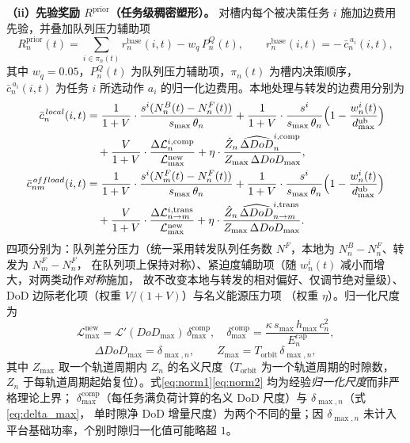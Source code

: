 \documentclass[a4paper,11pt]{article}
\begin{document}
\noindent\textbf{（ii）先验奖励 $R^{\mathrm{prior}}$（任务级稠密塑形）。}
对槽内每个被决策任务 $i$ 施加边费用先验，并叠加队列压力辅助项
\begin{equation}
R^{\mathrm{prior}}_n(t) = \sum_{i \in \pi_n(t)} r^{\mathrm{base}}_n(i,t) - w_q\, P^{Q}_n(t),
\qquad
r^{\mathrm{base}}_n(i,t) = -\,\bar{c}^{\,a_i}_n(i,t),
\label{eq:reward_prior}
\end{equation}
其中 $w_q=0.05$，$P^{Q}_n(t)$ 为队列压力辅助项，$\pi_n(t)$ 为槽内决策顺序，
$\bar{c}^{\,a_i}_n(i,t)$ 为任务 $i$ 所选动作 $a_i$ 的归一化边费用。本地处理与转发的边费用分别为
\begin{align}
\bar{c}^{\,local}_n(i,t) &=
\frac{1}{1+V}\cdot\frac{s^i(N^B_n(t) - N^F_n(t))}{s_{\max}\,\theta_n}
+ \frac{1}{1+V}\cdot\frac{s^i}{s_{\max}\,\theta_n}\Big(1-\frac{w^i_n(t)}{d^{\mathrm{ub}}_{\max}}\Big) \notag\\
&\quad
+ \frac{V}{1+V}\cdot\frac{\Delta\mathcal{L}^{i,\mathrm{comp}}_n}{\mathcal{L}^{\mathrm{new}}_{\max}}
+ \eta\cdot\frac{\hat{Z}_n\,\widehat{\Delta DoD}^{i,\mathrm{comp}}_n}
{Z_{\max}\,\Delta DoD_{\max}},
\label{eq:cost_local}\\
\bar{c}^{\,offload}_{nm}(i,t) &=
\frac{1}{1+V}\cdot\frac{s^i(N^F_m(t) - N^F_n(t))}{s_{\max}\,\theta_n}
+ \frac{1}{1+V}\cdot\frac{s^i}{s_{\max}\,\theta_n}\Big(1-\frac{w^i_n(t)}{d^{\mathrm{ub}}_{\max}}\Big) \notag\\
&\quad
+ \frac{V}{1+V}\cdot\frac{\Delta\mathcal{L}^{i,\mathrm{trans}}_{n\to m}}{\mathcal{L}^{\mathrm{new}}_{\max}}
+ \eta\cdot\frac{\hat{Z}_n\,\widehat{\Delta DoD}^{i,\mathrm{trans}}_{n\to m}}
{Z_{\max}\,\Delta DoD_{\max}}.
\label{eq:cost_offload}
\end{align}
四项分别为：队列差分压力（统一采用转发队列任务数 $N^F$，本地为 $N^B_n-N^F_n$、转发为 $N^F_m-N^F_n$，
在队列项上保持对称）、紧迫度辅助项（随 $w^i_n(t)$ 减小而增大，对两类动作\emph{对称}施加，
故不改变本地与转发的相对偏好、仅调节绝对量级）、DoD 边际老化项（权重 $V/(1+V)$）与名义能源压力项
（权重 $\eta$）。归一化尺度为
\begin{equation}
\mathcal{L}^{\mathrm{new}}_{\max} =
\mathcal{L}'(DoD_{\max})\,\delta^{\mathrm{comp}}_{\max},
\quad
\delta^{\mathrm{comp}}_{\max} = \frac{\kappa\, s_{\max}\, h_{\max}\, c^2_n}{E^{\mathrm{cap}}_n},
\label{eq:norm1}
\end{equation}
\begin{equation}
\Delta DoD_{\max} = \delta_{\max,n},
\qquad
Z_{\max} = T_{\mathrm{orbit}}\,\delta_{\max,n},
\label{eq:norm2}
\end{equation}
其中 $Z_{\max}$ 取一个轨道周期内 $Z_n$ 的名义尺度（$T_{\mathrm{orbit}}$ 为一个轨道周期的时隙数，
$Z_n$ 于每轨道周期起始复位）。式\eqref{eq:norm1}\eqref{eq:norm2} 均为经验\emph{归一化尺度}而非严格理论上界；
$\delta^{\mathrm{comp}}_{\max}$（每任务满负荷计算的名义 DoD 尺度）与 $\delta_{\max,n}$（式\eqref{eq:delta_max}，
单时隙净 DoD 增量尺度）为两个不同的量；因 $\delta_{\max,n}$ 未计入平台基础功率，个别时隙归一化值可能略超 $1$。
\end{document}
